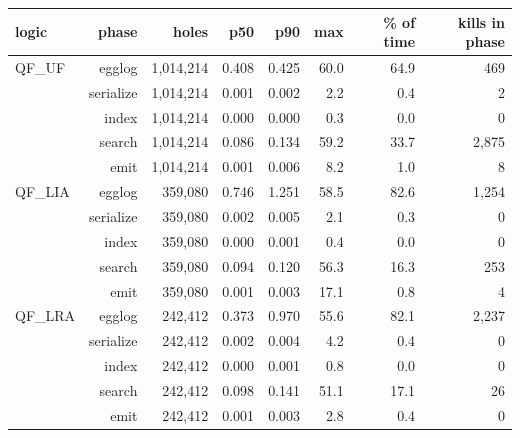 \begin{tabular}{lrrrrrrr}
\toprule
logic & phase & holes & p50 & p90 & max & \% of time & kills in phase \\
\midrule
QF\_UF & egglog & 1,014,214 & 0.408 & 0.425 & 60.0 & 64.9 & 469 \\
 & serialize & 1,014,214 & 0.001 & 0.002 & 2.2 & 0.4 & 2 \\
 & index & 1,014,214 & 0.000 & 0.000 & 0.3 & 0.0 & 0 \\
 & search & 1,014,214 & 0.086 & 0.134 & 59.2 & 33.7 & 2,875 \\
 & emit & 1,014,214 & 0.001 & 0.006 & 8.2 & 1.0 & 8 \\
\midrule
QF\_LIA & egglog & 359,080 & 0.746 & 1.251 & 58.5 & 82.6 & 1,254 \\
 & serialize & 359,080 & 0.002 & 0.005 & 2.1 & 0.3 & 0 \\
 & index & 359,080 & 0.000 & 0.001 & 0.4 & 0.0 & 0 \\
 & search & 359,080 & 0.094 & 0.120 & 56.3 & 16.3 & 253 \\
 & emit & 359,080 & 0.001 & 0.003 & 17.1 & 0.8 & 4 \\
\midrule
QF\_LRA & egglog & 242,412 & 0.373 & 0.970 & 55.6 & 82.1 & 2,237 \\
 & serialize & 242,412 & 0.002 & 0.004 & 4.2 & 0.4 & 0 \\
 & index & 242,412 & 0.000 & 0.001 & 0.8 & 0.0 & 0 \\
 & search & 242,412 & 0.098 & 0.141 & 51.1 & 17.1 & 26 \\
 & emit & 242,412 & 0.001 & 0.003 & 2.8 & 0.4 & 0 \\
\bottomrule
\end{tabular}
